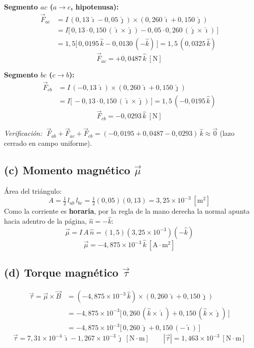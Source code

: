 \documentclass[12pt]{article}
\begin{document}
\noindent\textbf{Segmento $ac$ ($a\to c$, hipotenusa):}
\begin{align*}
    \vec{F}_{ac} &= I\,(0{,}13\,\hat{\imath}-0{,}05\,\hat{\jmath})\times(0{,}260\,\hat{\imath}+0{,}150\,\hat{\jmath}) \\
                 &= I\big[\,0{,}13\cdot0{,}150\,(\hat{\imath}\times\hat{\jmath})
                    - 0{,}05\cdot0{,}260\,(\hat{\jmath}\times\hat{\imath})\,\big] \\
                 &= 1{,}5\big[\,0{,}0195\,\hat{k} - 0{,}0130\,(-\hat{k})\,\big]
                  = 1{,}5\,(0{,}0325\,\hat{k})
\end{align*}
\[
    \boxed{\vec{F}_{ac} = +0{,}0487\,\hat{k}\ [\text{N}]}
\]

\noindent\textbf{Segmento $bc$ ($c\to b$):}
\begin{align*}
    \vec{F}_{cb} &= I\,(-0{,}13\,\hat{\imath})\times(0{,}260\,\hat{\imath}+0{,}150\,\hat{\jmath}) \\
                 &= I\big[\,-0{,}13\cdot0{,}150\,(\hat{\imath}\times\hat{\jmath})\,\big]
                  = 1{,}5\,(-0{,}0195\,\hat{k})
\end{align*}
\[
    \boxed{\vec{F}_{cb} = -0{,}0293\,\hat{k}\ [\text{N}]}
\]

\noindent\textit{Verificaci\'on:}
$\;\vec{F}_{ab}+\vec{F}_{ac}+\vec{F}_{cb}
= (-0{,}0195+0{,}0487-0{,}0293)\,\hat{k} \approx \vec{0}$ \quad(lazo cerrado en campo uniforme).

\subsection*{(c) Momento magn\'etico $\vec{\mu}$}

\'Area del tri\'angulo:
\[
    A = \tfrac{1}{2}\,l_{ab}\,l_{bc} = \tfrac{1}{2}(0{,}05)(0{,}13) = 3{,}25\times10^{-3}\ [\text{m}^2]
\]
Como la corriente es \textbf{horaria}, por la regla de la mano derecha la normal apunta
hacia adentro de la p\'agina, $\hat{n}=-\hat{k}$:
\[
    \vec{\mu} = I\,A\,\hat{n} = (1{,}5)(3{,}25\times10^{-3})(-\hat{k})
\]
\[
    \boxed{\vec{\mu} = -4{,}875\times10^{-3}\,\hat{k}\ [\text{A}\cdot\text{m}^2]}
\]

\subsection*{(d) Torque magn\'etico $\vec{\tau}$}

\begin{align*}
    \vec{\tau} = \vec{\mu}\times\vec{B}
       &= (-4{,}875\times10^{-3}\,\hat{k})\times(0{,}260\,\hat{\imath}+0{,}150\,\hat{\jmath}) \\
       &= -4{,}875\times10^{-3}\big[\,0{,}260\,(\hat{k}\times\hat{\imath})
          + 0{,}150\,(\hat{k}\times\hat{\jmath})\,\big] \\
       &= -4{,}875\times10^{-3}\big[\,0{,}260\,\hat{\jmath} + 0{,}150\,(-\hat{\imath})\,\big]
\end{align*}
\[
    \boxed{\vec{\tau} = 7{,}31\times10^{-4}\,\hat{\imath} - 1{,}267\times10^{-3}\,\hat{\jmath}\ [\text{N}\cdot\text{m}]}
    \qquad |\vec{\tau}| = 1{,}463\times10^{-3}\ [\text{N}\cdot\text{m}]
\]
\end{document}
